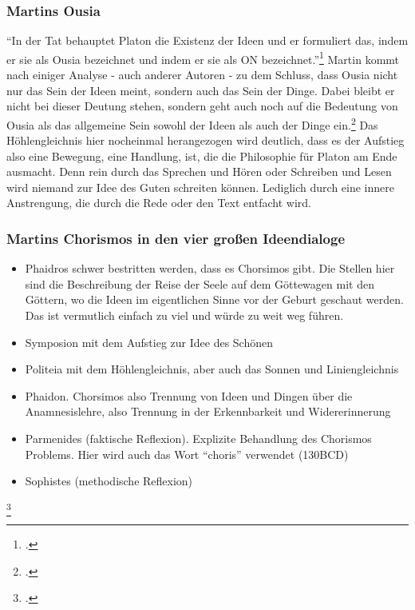 \subsubsection*{Martins Ousia}
\enquote{In der Tat behauptet Platon die Existenz der Ideen und er formuliert das, indem er sie als Ousia bezeichnet und indem er sie als ON bezeichnet.}\footcite[][S. 187]{Martin73}
Martin kommt nach einiger Analyse - auch anderer Autoren - zu dem Schluss, dass Ousia nicht nur das Sein der Ideen meint, sondern auch das Sein der Dinge. Dabei bleibt er nicht bei dieser Deutung stehen, sondern geht auch noch auf die Bedeutung von Ousia als das allgemeine Sein sowohl der Ideen als auch der Dinge ein.\footcite[vgl.][S. 195ff.]{Martin73}
Das Höhlengleichnis hier nocheinmal herangezogen wird deutlich, dass es der Aufstieg also eine Bewegung, eine Handlung, ist, die die Philosophie für Platon am Ende ausmacht. Denn rein durch das Sprechen und Hören oder Schreiben und Lesen wird niemand zur Idee des Guten schreiten können. Lediglich durch eine innere Anstrengung, die durch die Rede oder den Text entfacht wird.
\subsubsection*{Martins Chorismos in den vier großen Ideendialoge}

\begin{itemize}
    \item {Phaidros schwer bestritten werden, dass es Chorsimos gibt. Die Stellen hier sind die Beschreibung der Reise der Seele auf dem Göttewagen mit den Göttern, wo die Ideen im eigentlichen Sinne vor der Geburt geschaut werden. Das ist vermutlich einfach zu viel und würde zu weit weg führen.}
    \item {Symposion mit dem Aufstieg zur Idee des Schönen}
    \item {Politeia mit dem Höhlengleichnis, aber auch das Sonnen und Liniengleichnis}
    \item {Phaidon. Chorsimos also Trennung von Ideen und Dingen über die Anamnesislehre, also Trennung in der Erkennbarkeit und Widererinnerung}
    \item {Parmenides (faktische Reflexion). Explizite Behandlung des Chorismos Problems. Hier wird auch das Wort \enquote{choris} verwendet (130BCD)}
    \item {Sophistes (methodische Reflexion)}
\end{itemize}
\footcite[vgl.][S. 160]{Martin73}


